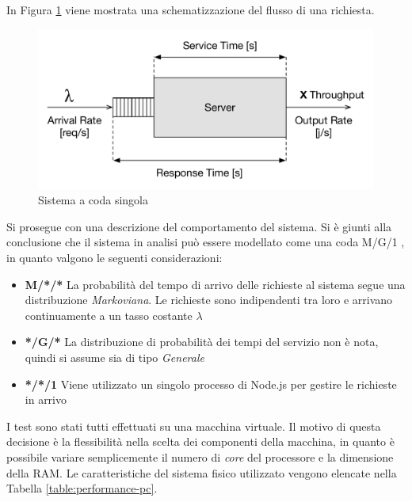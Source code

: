 In Figura \ref{fig:sistema-coda} viene mostrata una schematizzazione del flusso di una richiesta.

\begin{figure}[ht]
	\centering
	\includegraphics[width=\textwidth]{7-performance/Immagini/sistema_coda.pdf}
	\caption{Sistema a coda singola}\label{fig:sistema-coda}
\end{figure}

Si prosegue con una descrizione del comportamento del sistema. Si è giunti alla conclusione che il sistema in analisi può essere modellato come una coda M/G/1 \cite{sundarapandian2009probability}, in quanto valgono le seguenti considerazioni:

\begin{itemize}
	\item \textbf{M/*/*}
	La probabilità del tempo di arrivo delle richieste al sistema segue una distribuzione \emph{Markoviana}. Le richieste sono indipendenti tra loro e arrivano continuamente a un tasso costante $ \lambda $
	\item \textbf{*/G/*}
	La distribuzione di probabilità dei tempi del servizio non è nota, quindi si assume sia di tipo \emph{Generale}
	\item \textbf{*/*/1}
	Viene utilizzato un singolo processo di Node.js per gestire le richieste in arrivo
\end{itemize}

I test sono stati tutti effettuati su una macchina virtuale. Il motivo di questa decisione è la flessibilità nella scelta dei componenti della macchina, in quanto è possibile variare semplicemente il numero di \emph{core} del processore e la dimensione della RAM. Le caratteristiche del sistema fisico utilizzato vengono elencate nella Tabella \ref{table:performance-pc}.

